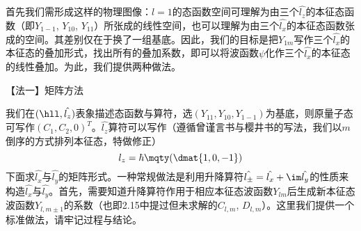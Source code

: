 \begin{enumerate}[label=2.\arabic*]
首先我们需形成这样的物理图像：$l=1$的态函数空间可理解为由三个$\hat{l_z}$的本征态函数（即$Y_{1-1}$, $Y_{10}$, $Y_{11}$）所张成的线性空间，也可以理解为由三个$\hat{l_x}$的本征态函数张成的空间。其差别仅在于换了一组基底。因此，我们的目标是把$Y_{1m}$写作三个$\hat{l_x}$的本征态的叠加形式，找出所有的叠加系数，即可以将波函数$\psi$化作三个$\hat{l_x}$的本征态的线性叠加。为此，我们提供两种做法。

【法一】矩阵方法

我们在$(\hll,\hat{l_z})$表象描述态函数与算符，选$(Y_{11},Y_{10},Y_{1-1})$为基底，则原量子态可写作$(C_1,C_2,0)^T$。$\hat{l_z}$算符可以写作（遵循曾谨言书与樱井书的写法，我们以$m$倒序的方式排列本征态，特做修正）
\[l_z = \hbar\mqty(\dmat{1,0,-1})\]
下面求$\hat{l_x}$与$\hat{l_y}$的矩阵形式。{\color{red}一种常规做法是利用升降算符$\hat{l_\pm}=\hat{l_x}+\im\hat{l_y}$的性质来构造$\hat{l_x}$与$\hat{l_y}$}。首先，需要知道升降算符作用于相应本征态波函数$Y_{lm}$后生成新本征态波函数$Y_{l,m\pm1}$的系数（也即2.15中提过但未求解的$C_{l,m}$, $D_{l,m}$）。{\color{red}这里我们提供一个标准做法，请牢记过程与结论。}


\end{enumerate}
